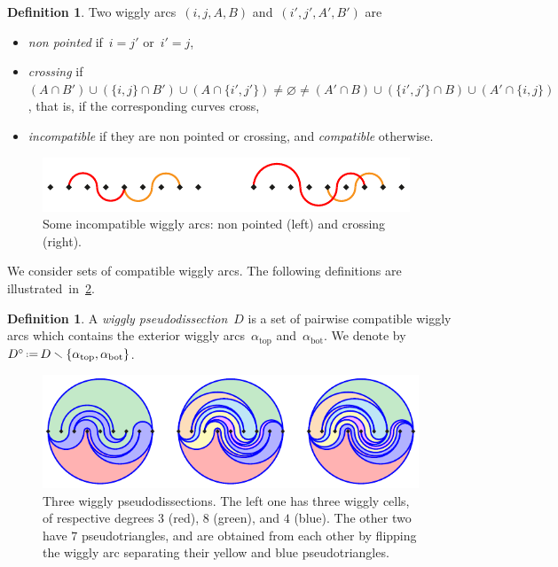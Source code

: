 \documentclass{amsart}
\theoremstyle{definition}
\newtheorem{definition}[theorem]{Definition}
\newcommand{\ssm}{\smallsetminus} %
\newcommand{\eqdef}{\mbox{\,\raisebox{0.2ex}{\scriptsize\ensuremath{\mathrm:}}\ensuremath{=}\,}} %
\newcommand{\darkblue}{\color{darkblue}} %
\newcommand{\defn}[1]{\textsl{\darkblue #1}} %
\begin{document}
\begin{definition}
Two wiggly arcs~$(i,j,A,B)$ and~$(i',j',A',B')$ are 
\begin{itemize}
\item \defn{non pointed} if~$i = j'$ or~$i' = j$,
\item \defn{crossing} if~$(A \cap B') \cup (\{i,j\} \cap B') \cup (A \cap \{i',j'\}) \ne \varnothing \ne (A' \cap B) \cup (\{i',j'\} \cap B) \cup (A' \cap \{i,j\})$, that is, if the corresponding curves cross,
\item \defn{incompatible} if they are non pointed or crossing, and \defn{compatible} otherwise.
\end{itemize}
%
\begin{figure}[h]
\centerline{\includegraphics[scale=1.3]{incompatible}}
\caption{Some incompatible wiggly arcs: non pointed (left) and crossing (right).}
\label{fig:incompatible}
\end{figure}
\end{definition}

We consider sets of compatible wiggly arcs.
The following definitions are illustrated~in~\cref{fig:pseudodissections}.

\begin{definition}
A \defn{wiggly pseudodissection}~$D$ is a set of pairwise compatible wiggly arcs which contains the exterior wiggly arcs~$\alpha_\mathrm{top}$ and~$\alpha_\mathrm{bot}$. We denote by~$D^\circ \eqdef D \ssm \{\alpha_\mathrm{top}, \alpha_\mathrm{bot}\}$.
%
\begin{figure}[b]
\centerline{\includegraphics[scale=1.5]{pseudodissections}}
\caption{Three wiggly pseudodissections. The left one has three wiggly cells, of respective degrees $3$ (red), $8$ (green), and $4$ (blue). The other two have $7$ pseudotriangles, and are obtained from each other by flipping the wiggly arc separating their yellow and blue pseudotriangles.}
\label{fig:pseudodissections}
\end{figure}
\end{definition}
\end{document}
